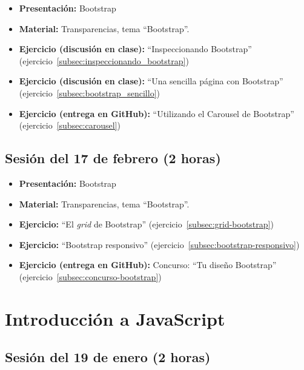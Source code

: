 \documentclass[a4paper,12pt]{report}
\begin{document}
\begin{itemize}
\item \textbf{Presentación:} Bootstrap
\item \textbf{Material:} Transparencias, tema ``Bootstrap''.
\item \textbf{Ejercicio (discusión en clase):} ``Inspeccionando Bootstrap'' (ejercicio~\ref{subsec:inspeccionando_bootstrap})
\item \textbf{Ejercicio (discusión en clase):} ``Una sencilla página con Bootstrap'' (ejercicio~\ref{subsec:bootstrap_sencillo})
\item \textbf{Ejercicio (entrega en GitHub):} ``Utilizando el Carousel de Bootstrap'' (ejercicio~\ref{subsec:carousel})

\end{itemize}

\subsection{Sesión del 17 de febrero (2 horas)}

\begin{itemize}
\item \textbf{Presentación:} Bootstrap
\item \textbf{Material:} Transparencias, tema ``Bootstrap''.
\item \textbf{Ejercicio:} ``El \emph{grid} de Bootstrap'' (ejercicio~\ref{subsec:grid-bootstrap})
\item \textbf{Ejercicio:} ``Bootstrap responsivo'' (ejercicio~\ref{subsec:bootstrap-responsivo})
\item \textbf{Ejercicio (entrega en GitHub):} Concurso: ``Tu diseño Bootstrap'' (ejercicio~\ref{subsec:concurso-bootstrap})
\end{itemize}




\section{Introducción a JavaScript}

\subsection{Sesión del 19 de enero (2 horas)}
\end{document}
